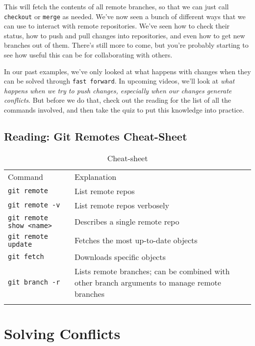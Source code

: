 This will fetch the contents of all remote branches, so that we can just call \verb|checkout| or \verb|merge| as needed. We've now seen a bunch of different ways that we can use to interact with remote repositories. We've seen how to check their status, how to push and pull changes into repositories, and even how to get new branches out of them. 
There's still more to come, but you're probably starting to see how useful this can be for collaborating with others.

In our past examples, we've only looked at what happens with changes when they can be solved through \verb|fast forward|. In upcoming videos, we'll look at \textit{what happens when we try to push changes, especially when our changes generate conflicts}. 
But before we do that, check out the reading for the list of all the commands involved, and then take the quiz to put this knowledge into practice.

\subsection{Reading: Git Remotes Cheat-Sheet} \label{W302e}

\begin{table}
	\caption{Cheat-sheet}
	\label{tab:W302e}       %
	\begin{tabular}{p{4cm}p{7.5cm}}
		\hline\noalign{\smallskip}
		Command & Explanation \\
		\noalign{\smallskip}\svhline\noalign{\smallskip}
		\verb|git remote| & List remote repos \\
		\verb|git remote -v| & List remote repos verbosely\\
		\verb|git remote show <name>| & Describes a single remote repo \\
		\verb|git remote update| & Fetches the most up-to-date objects \\
		\verb|git fetch| & Downloads specific objects \\		
		\verb|git branch -r| & Lists remote branches; can be combined with other branch arguments to manage remote branches \\
		\noalign{\smallskip}\hline\noalign{\smallskip}
	\end{tabular}
\end{table}

\section{Solving Conflicts} \label{W303}

